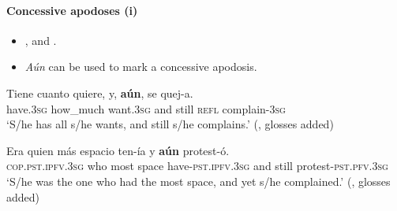 \paragraph{Concessive apodoses (i)}
\label{appendixSpanishAunConcessiveConsequent}
\begin{itemize}
	\item \textcite{Cid1999}, \textcite{OlivaresSorpena2001} and \textcite[s.v. \textit{aun}]{RAEDictionary}.
	\item \textit{Aún} can be used to mark a concessive apodosis.
\end{itemize}
\begin{exe}
	\ex 
	\gll Tiene cuanto quiere, y, \textbf{aún}, se quej-a.\\
	have.3\textsc{sg} how\_much want.3\textsc{sg} and still \textsc{refl} complain-3\textsc{sg}\\
	\glt \lq S/he has all s/he wants, and still s/he complains.' (\cite[103]{Cid1999}, glosses added)

	\ex
	\gll Era quien más espacio ten-ía y \textbf{aún} protest-ó.\\
	\textsc{cop}.\textsc{pst}.\textsc{ipfv}.3\textsc{sg} who most space have-\textsc{pst}.\textsc{ipfv}.3\textsc{sg} and still protest-\textsc{pst}.\textsc{pfv}.3\textsc{sg}\\
	\glt \lq S/he was the one who had the most space, and yet s/he complained.' (\cite[s.v. \textit{aun}]{RAEDictionary}, glosses added)
\end{exe}

